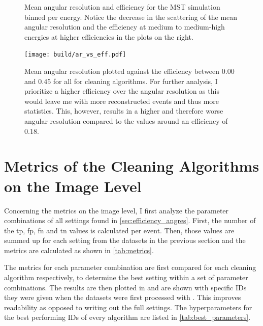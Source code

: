 \begin{figure}
\begin{subfigure}{0.48\textwidth}
    \end{subfigure}
    \caption{Mean angular resolution and efficiency for the MST simulation binned per energy. Notice
    the decrease in the scattering of the mean angular resolution and the efficiency at medium to
    medium-high energies at higher efficiencies in the plots on the right.\vspace{-0.5cm}}%
    \label{fig:efficiency_angres}
\end{figure}
\begin{figure}[!htbp]
    \centering
    \texttt{[image: build/ar\_vs\_eff.pdf]}
    \caption{Mean angular resolution plotted against the efficiency between \(\num{0.00}\) and \(\num{0.45}\) for
    all for cleaning algorithms. For further analysis, I prioritize a higher efficiency over the angular resolution
    as this would leave me with more reconstructed events and thus more statistics. This, however, results in
    a higher and therefore worse angular resolution compared to \eg the values around an efficiency of \(0.18\).}%
    \label{fig:ar_vs_eff}
\end{figure}


\section{Metrics of the Cleaning Algorithms on the Image Level}%
\label{sec:metrics}
Concerning the metrics on the image level, I first analyze the parameter combinations of all settings found in \autoref{sec:efficiency_angres}. First,
the number of the \gls{tp}, \gls{fp}, \gls{fn} and \gls{tn} values is calculated per event. Then,
those values are summed up for each setting from the datasets in the previous section and the metrics are calculated as shown in
\autoref{tab:metrics}.

The metrics for each parameter combination are first compared for each cleaning algorithm respectively,
to determine the best setting within a set of parameter combinations. The results are then plotted in
and are shown with specific IDs they were given when the datasets were first processed with \ctapipe.
This improves readability as opposed to writing out the full settings. The hyperparameters for the best performing
IDs of every algorithm are listed in \autoref{tab:best_parameters}.

